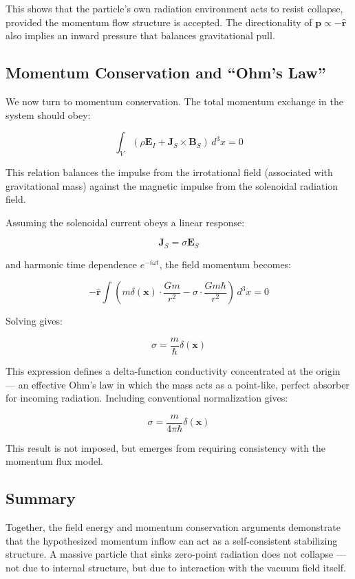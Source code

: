 \documentclass {article}
\renewcommand\vec{\mathbf}
\let\OldHat\hat
\renewcommand{\hat}[1]{\OldHat{\mathbf{#1}}}
\begin{document}
This shows that the particle's own radiation environment acts to resist collapse, provided the momentum flow structure is accepted. The directionality of \(\vec{p} \propto -\hat{r}\) also implies an inward pressure that balances gravitational pull.

\subsection{Momentum Conservation and “Ohm’s Law”}

We now turn to momentum conservation. The total momentum exchange in the system should obey:

\[
\int_V \left( \rho \vec{E}_I + \vec{J}_S \times \vec{B}_S \right) \, d^3x = 0
\]

This relation balances the impulse from the irrotational field (associated with gravitational mass) against the magnetic impulse from the solenoidal radiation field.

Assuming the solenoidal current obeys a linear response:

\[
\vec{J}_S = \sigma \vec{E}_S
\]

and harmonic time dependence \(e^{-i \omega t}\), the field momentum becomes:

\[
-\hat{r} \int \left( m \delta(\vec{x}) \cdot \frac{G m}{r^2} - \sigma \cdot \frac{G m \hbar}{r^2} \right) \, d^3x = 0
\]

Solving gives:

\[
\sigma = \frac{m}{\hbar} \delta(\vec{x})
\]

This expression defines a delta-function conductivity concentrated at the origin — an effective Ohm's law in which the mass acts as a point-like, perfect absorber for incoming radiation. Including conventional normalization gives:

\[
\sigma = \frac{m}{4\pi \hbar} \delta(\vec{x})
\]

This result is not imposed, but emerges from requiring consistency with the momentum flux model.

\subsection{Summary}

Together, the field energy and momentum conservation arguments demonstrate that the hypothesized momentum inflow can act as a self-consistent stabilizing structure. A massive particle that sinks zero-point radiation does not collapse — not due to internal structure, but due to interaction with the vacuum field itself.
\end{document}
